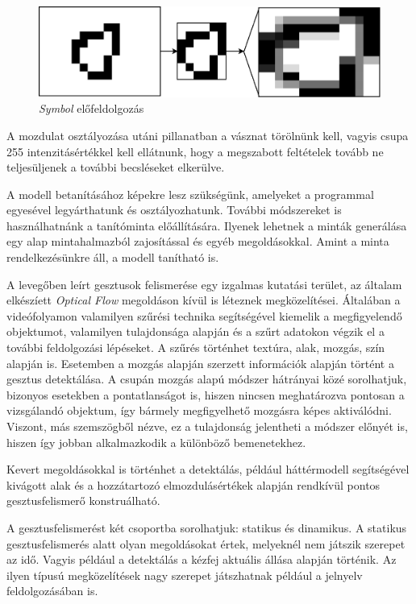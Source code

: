 \begin{figure}[h]
\centering
\includegraphics[width=10truecm]{images/crop_resize.png}
\caption{\textit{Symbol} előfeldolgozás}
\label{fig:symbol_pre}
\end{figure}

A mozdulat osztályozása utáni pillanatban a vásznat törölnünk kell, vagyis csupa 255 intenzitásértékkel kell ellátnunk, hogy a megszabott feltételek tovább ne teljesüljenek a további becsléseket elkerülve.

A modell betanításához képekre lesz szükségünk, amelyeket a programmal egyesével legyárthatunk és osztályozhatunk. További módszereket is használhatnánk a tanítóminta előállítására. Ilyenek lehetnek a minták generálása egy alap mintahalmazból zajosítással és egyéb megoldásokkal. Amint a minta rendelkezésünkre áll, a modell tanítható is.

A levegőben leírt gesztusok felismerése egy izgalmas kutatási terület, az általam elkészíett \textit{Optical Flow} megoldáson kívül is léteznek megközelítései. Általában a videófolyamon valamilyen szűrési technika segítségével kiemelik a megfigyelendő objektumot, valamilyen tulajdonsága alapján és a szűrt adatokon végzik el a további feldolgozási lépéseket. A szűrés történhet textúra, alak, mozgás, szín alapján is. \cite{fadhil2018trackingsurvey} Esetemben a mozgás alapján szerzett információk alapján történt a gesztus detektálása. A csupán mozgás alapú módszer hátrányai közé sorolhatjuk, bizonyos esetekben a pontatlanságot is, hiszen nincsen meghatározva pontosan a vizsgálandó objektum, így bármely megfigyelhető mozgásra képes aktiválódni. Viszont, más szemszögből nézve, ez a tulajdonság jelentheti a módszer előnyét is, hiszen így jobban alkalmazkodik a különböző bemenetekhez.

Kevert megoldásokkal is történhet a detektálás, például háttérmodell segítségével kivágott alak és a hozzátartozó elmozdulásértékek alapján rendkívül pontos gesztusfelismerő konstruálható. \cite{lin2009recognizing}

A gesztusfelismerést két csoportba sorolhatjuk: statikus és dinamikus. A statikus gesztusfelismerés alatt olyan megoldásokat értek, melyeknél nem játszik szerepet az idő. Vagyis például a detektálás a kézfej aktuális állása alapján történik. \cite{purohit2018precisehand} \cite{robust2017mouse} \cite{kumar2019calculator} Az ilyen típusú megközelítések nagy szerepet játszhatnak például a jelnyelv feldolgozásában is.

